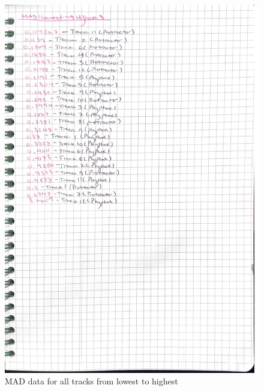 \documentclass[idxtotoc,hyperref,openany]{labbook} %
\begin{document}
\begin{figure}[H] %
\begin{center}
\includegraphics[width=0.9\linewidth]{images/PhyProMADLH.png}
\end{center}
\caption{MAD data for all tracks from lowest to highest}
\label{fig:MADLHPhyphoxProtractor}
\end{figure}

\end{document}
